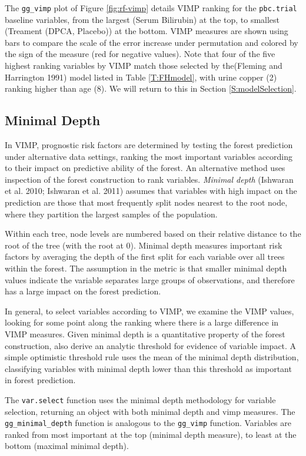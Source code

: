\documentclass[article]{jss}
\begin{document}
The \texttt{gg\_vimp} plot of Figure \ref{fig:rf-vimp} details VIMP
ranking for the \texttt{pbc.trial} baseline variables, from the largest
(Serum Bilirubin) at the top, to smallest (Treament (DPCA, Placebo)) at
the bottom. VIMP measures are shown using bars to compare the scale of
the error increase under permutation and colored by the sign of the
measure (red for negative values). Note that four of the five highest
ranking variables by VIMP match those selected by the(Fleming and
Harrington 1991) model listed in Table \ref{T:FHmodel}, with urine
copper (2) ranking higher than age (8). We will return to this in
Section \ref{S:modelSelection}.

\subsection{Minimal Depth}\label{minimal-depth}

In VIMP, prognostic risk factors are determined by testing the forest
prediction under alternative data settings, ranking the most important
variables according to their impact on predictive ability of the forest.
An alternative method uses inspection of the forest construction to rank
variables. \emph{Minimal depth} (Ishwaran et al. 2010; Ishwaran et al.
2011) assumes that variables with high impact on the prediction are
those that most frequently split nodes nearest to the root node, where
they partition the largest samples of the population.

Within each tree, node levels are numbered based on their relative
distance to the root of the tree (with the root at 0). Minimal depth
measures important risk factors by averaging the depth of the first
split for each variable over all trees within the forest. The assumption
in the metric is that smaller minimal depth values indicate the variable
separates large groups of observations, and therefore has a large impact
on the forest prediction.

In general, to select variables according to VIMP, we examine the VIMP
values, looking for some point along the ranking where there is a large
difference in VIMP measures. Given minimal depth is a quantitative
property of the forest construction, \cite{Ishwaran:2010} also derive an
analytic threshold for evidence of variable impact. A simple optimistic
threshold rule uses the mean of the minimal depth distribution,
classifying variables with minimal depth lower than this threshold as
important in forest prediction.

The  \texttt{var.select} function uses the minimal
depth methodology for variable selection, returning an object with both
minimal depth and vimp measures. The 
\texttt{gg\_minimal\_depth} function is analogous to the
\texttt{gg\_vimp} function. Variables are ranked from most important at
the top (minimal depth measure), to least at the bottom (maximal minimal
depth).
\end{document}
